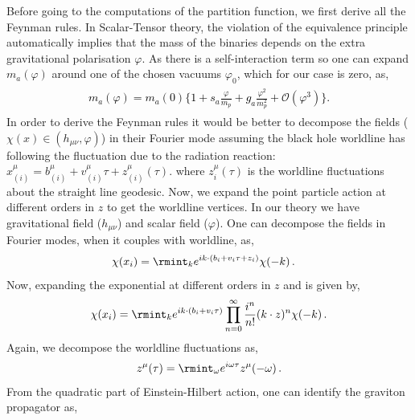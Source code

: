 Before going to the computations of the partition function, we first derive all the Feynman rules. In Scalar-Tensor theory, the violation of the equivalence principle automatically implies that the mass of the binaries depends on the extra gravitational polarisation ${\varphi}$. As there is a self-interaction term so one can expand $m_{a}(\varphi)$ around one of the chosen vacuums ${\varphi}_{0}$, which for our case is zero, as,
\textcolor{black}{
\begin{align}
    \begin{split}
        m_a({\varphi})=m_a(0)\Big \{1+s_a\frac{\varphi}{m_p}+g_a\frac{\varphi^2}{m_p^2}+\mathcal{O}(\varphi^3)\Big\}.
    \end{split}
\end{align}}
In order to derive the Feynman rules it would be better to decompose the fields  ($\chi(x)\in(h_{\mu\nu},\varphi)$) in their Fourier mode assuming the black hole worldline has following the fluctuation due to the radiation reaction: $x_{(i)}^{\mu}=b_{(i)}^{\mu}+v_{(i)}^{\mu}\tau+z_{(i)}^{\mu}(\tau)$. where $z_{i}^{\mu}(\tau)$ is the worldline fluctuations about the straight line geodesic. Now, we expand the point particle action at different orders in $z$ to get the worldline vertices. In our theory we have gravitational field ($ h_{\mu\nu}$) and scalar field (${\varphi}$). One can decompose the fields in Fourier modes, when it couples with worldline, as,
\begin{align}
    \begin{split}
        &  \chi(x_i)=\rmint_{k}e^{ik\cdot(b_i+v_i\tau+z_i)} \chi(-k)\,.
    \end{split}
\end{align}
Now, expanding the exponential at different orders in $z$ and is given by,
\begin{align}
    \begin{split}
         \chi (x_i)=\rmint_{k}e^{ik\cdot(b_i+v_i \tau)}\prod_{n=0}^{\infty}\frac{i^{n}}{n!}(k\cdot z)^{n}  \chi(-k)\,.\label{3.8m}
    \end{split}
\end{align}
Again, we decompose the worldline fluctuations as,
\begin{align}
    \begin{split}
        z^{\mu}(\tau)=\rmint_{\omega}e^{i\omega \tau}z^{\mu}(-\omega)\,.
    \end{split}\end{align}
From the quadratic part of Einstein-Hilbert action, one can identify the graviton propagator as,
